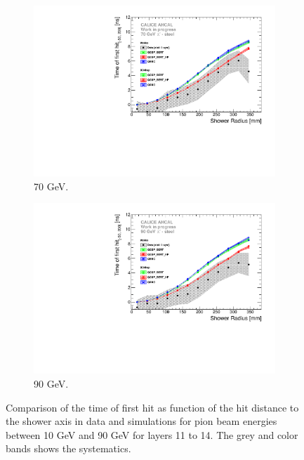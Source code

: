 \begin{figure}[htbp!]
\begin{subfigure}[t]{0.5\textwidth}
    \includegraphics[width=1\textwidth]{../Thesis_Plots/Timing/Pions/Plots/ComparisonToSim/Time_Radius_70GeV_BL.pdf}
    \caption{70 GeV.} \label{fig:Radius_BL_SimData_70GeV}
  \end{subfigure}
  \hfill
  \begin{subfigure}[t]{0.5\textwidth}
    \centering
    \includegraphics[width=1\textwidth]{../Thesis_Plots/Timing/Pions/Plots/ComparisonToSim/Time_Radius_90GeV_BL.pdf}
    \caption{90 GeV.} \label{fig:Radius_BL_SimData_90GeV}
  \end{subfigure}
  \caption{Comparison of the time of first hit as function of the hit distance to the shower axis in data and simulations for pion beam energies between 10 GeV and 90 GeV for layers 11 to 14. The grey and color bands shows the systematics.}
  \label{fig:Radius_BL_SimData_Comparison}
\end{figure}


